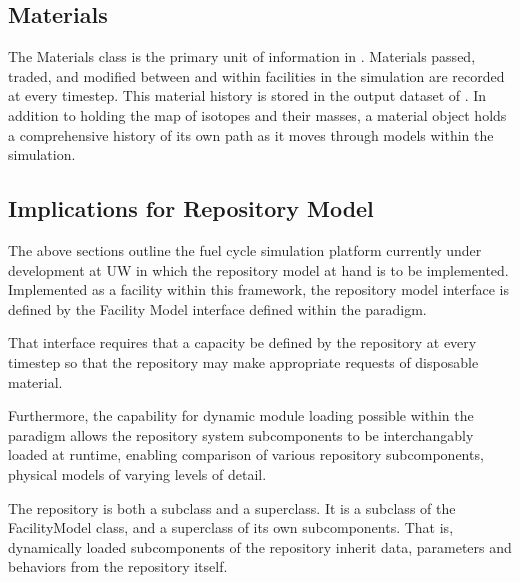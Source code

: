 \subsection{Materials}

The Materials class is the primary unit of information in \Cyclus.  
Materials passed, traded, and modified between and within facilities 
in the simulation are recorded at every timestep.  This material 
history is stored in the output dataset of \Cyclus. In addition to 
holding the map of isotopes and their masses, a material object holds 
a comprehensive history of its own path as it moves through models 
within the simulation. 

\subsection{Implications for Repository Model}

The above sections outline the fuel cycle simulation platform
currently under development at \gls{UW} in which the repository model
at hand is to be implemented.  Implemented as a facility within this 
framework, the repository model interface is defined by the Facility
Model interface defined within the \Cyclus paradigm. 

That interface requires that a capacity be defined by the repository at every 
\Cyclus timestep so that the repository may make appropriate requests of 
disposable material.

Furthermore, the capability for dynamic module loading possible within 
the \Cyclus paradigm allows the repository system subcomponents to be 
interchangably loaded at runtime, enabling comparison of various 
repository subcomponents, physical models of varying levels of detail. 

The repository is both a subclass and a superclass. It is a subclass of the 
FacilityModel class, and a superclass of its own subcomponents. That is, 
dynamically loaded subcomponents of the repository inherit data, parameters and 
behaviors from the repository itself. 





